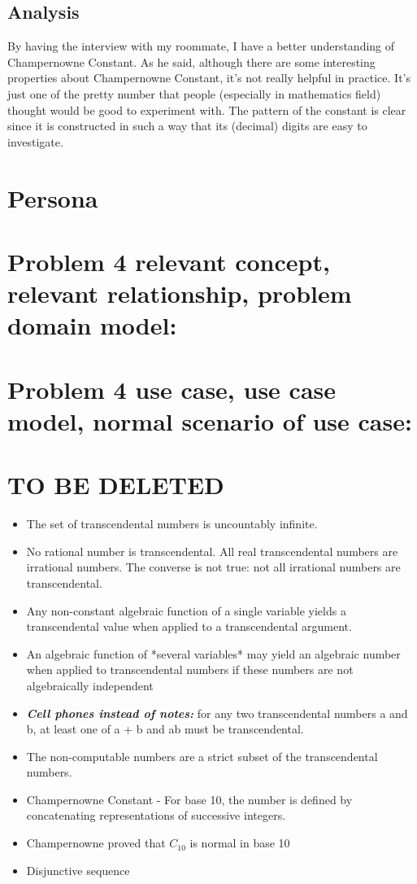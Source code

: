 \documentclass[10pt]{article}
\begin{document}
\subsection{Analysis}
By having the interview with my roommate, I have a better understanding of Champernowne Constant. As he said, although there are some interesting properties about Champernowne Constant, it's not really helpful in practice. It's just one of the pretty number that people (especially in mathematics field) thought would be good to experiment with. The pattern of the constant is clear since it is constructed in such a way that its (decimal) digits are easy to investigate.

\pagebreak

\section{Persona}

\section*{\normalsize \textbf{Problem 4 relevant concept, relevant relationship, problem domain model:}}

\section*{\normalsize \textbf{Problem 4 use case, use case model, normal scenario of use case:}}

\section*{\normalsize \textbf{TO BE DELETED}}
\begin{itemize}
\item The set of transcendental numbers is uncountably infinite. 
\item  No rational number is transcendental. All real transcendental numbers are irrational numbers. The converse is not true: not all irrational numbers are transcendental.
\item  Any non-constant algebraic function of a single variable yields a transcendental value when applied to a transcendental argument.
\item  An algebraic function of *several variables* may yield an algebraic number when applied to transcendental numbers if these numbers are not algebraically independent
\item \textit{\textbf{Cell phones instead of notes:}} for any two transcendental numbers a and b, at least one of a + b and ab must be transcendental.
\item The non-computable numbers are a strict subset of the transcendental numbers.


\item Champernowne Constant - For base 10, the number is defined by concatenating representations of successive integers.
\item Champernowne proved that $C_{10}$ is normal in base 10
\item Disjunctive sequence

\end{itemize}
\end{document}
